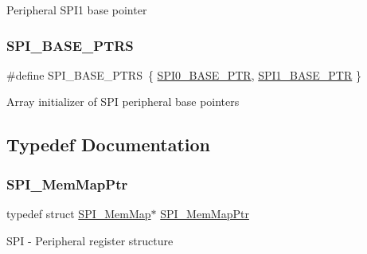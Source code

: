 Peripheral S\+P\+I1 base pointer \mbox{\label{group___s_p_i___peripheral_ga3a16fecfe27c2052ab60e014be3f66f6}} 
\subsubsection{\texorpdfstring{S\+P\+I\+\_\+\+B\+A\+S\+E\+\_\+\+P\+T\+RS}{SPI\_BASE\_PTRS}}
{\footnotesize\ttfamily \#define S\+P\+I\+\_\+\+B\+A\+S\+E\+\_\+\+P\+T\+RS~\{ \hyperlink{group___s_p_i___peripheral_ga851f64a97b5919c1f99a34db5918b3b4}{S\+P\+I0\+\_\+\+B\+A\+S\+E\+\_\+\+P\+TR}, \hyperlink{group___s_p_i___peripheral_gae28fd789e0602a32076c1c13ca39f5af}{S\+P\+I1\+\_\+\+B\+A\+S\+E\+\_\+\+P\+TR} \}}

Array initializer of S\+PI peripheral base pointers 

\subsection{Typedef Documentation}
\mbox{\label{group___s_p_i___peripheral_ga7e4e9921e4d56bdbb10a04e77743ff5e}} 
\subsubsection{\texorpdfstring{S\+P\+I\+\_\+\+Mem\+Map\+Ptr}{SPI\_MemMapPtr}}
{\footnotesize\ttfamily typedef struct \hyperlink{struct_s_p_i___mem_map}{S\+P\+I\+\_\+\+Mem\+Map}$\ast$ \hyperlink{group___s_p_i___peripheral_ga7e4e9921e4d56bdbb10a04e77743ff5e}{S\+P\+I\+\_\+\+Mem\+Map\+Ptr}}

S\+PI -\/ Peripheral register structure 